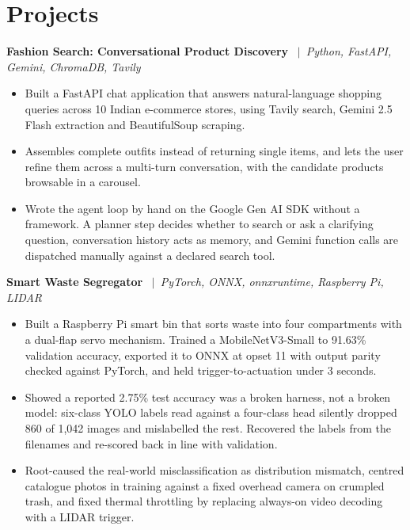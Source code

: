 \documentclass[a4paper,9pt]{extarticle}
\newcommand{\sep}{\ $\vert$\ }
\begin{document}
\section*{Projects}

\textbf{Fashion Search: Conversational Product Discovery} \sep \textit{Python, FastAPI, Gemini, ChromaDB, Tavily}
\begin{itemize}
  \item Built a FastAPI chat application that answers natural-language shopping queries across 10 Indian e-commerce stores, using Tavily search, Gemini 2.5 Flash extraction and BeautifulSoup scraping.
  \item Assembles complete outfits instead of returning single items, and lets the user refine them across a multi-turn conversation, with the candidate products browsable in a carousel.
  \item Wrote the agent loop by hand on the Google Gen AI SDK without a framework. A planner step decides whether to search or ask a clarifying question, conversation history acts as memory, and Gemini function calls are dispatched manually against a declared search tool.
\end{itemize}
\vspace{2pt}

\textbf{Smart Waste Segregator} \sep \textit{PyTorch, ONNX, onnxruntime, Raspberry Pi, LIDAR}
\begin{itemize}
  \item Built a Raspberry Pi smart bin that sorts waste into four compartments with a dual-flap servo mechanism. Trained a MobileNetV3-Small to 91.63\% validation accuracy, exported it to ONNX at opset 11 with output parity checked against PyTorch, and held trigger-to-actuation under 3 seconds.
  \item Showed a reported 2.75\% test accuracy was a broken harness, not a broken model: six-class YOLO labels read against a four-class head silently dropped 860 of 1,042 images and mislabelled the rest. Recovered the labels from the filenames and re-scored back in line with validation.
  \item Root-caused the real-world misclassification as distribution mismatch, centred catalogue photos in training against a fixed overhead camera on crumpled trash, and fixed thermal throttling by replacing always-on video decoding with a LIDAR trigger.
\end{itemize}
\vspace{2pt}
\end{document}
